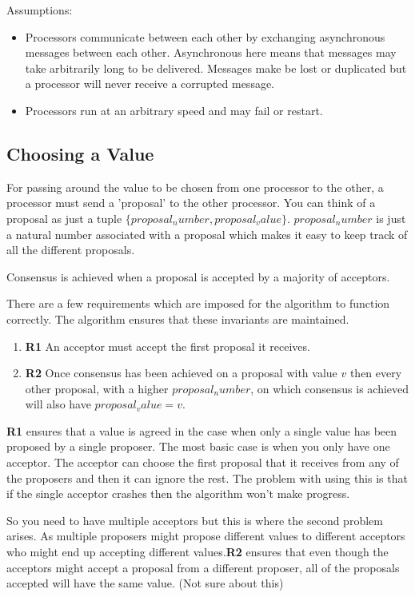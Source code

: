 Assumptions:
\begin{itemize}
  \item Processors communicate between each other by exchanging asynchronous messages between each other.
    Asynchronous here means that messages may take arbitrarily long to be delivered.
    Messages make be lost or duplicated but a processor will never receive a corrupted message.
  \item Processors run at an arbitrary speed and may fail or restart.
\end{itemize}

\subsection{Choosing a Value}
For passing around the value to be chosen from one processor to the other,
a processor must send a 'proposal' to the other processor.
You can think of a proposal as just a tuple $\lbrace proposal_number, proposal_value \rbrace$.
$proposal_number$ is just a natural number associated with a proposal which makes
it easy to keep track of all the different proposals.

Consensus is achieved when a proposal is accepted by a majority of acceptors.

There are a few requirements which are imposed for the algorithm to function correctly.
The algorithm ensures that these invariants are maintained.
\begin{enumerate}
  \item \textbf{R1} An acceptor must accept the first proposal it receives.
  \item \textbf{R2} Once consensus has been achieved on a proposal with value $v$
    then every other proposal, with a higher $proposal_number$, on which consensus
    is achieved will also have $proposal_value = v$.
\end{enumerate}

\textbf{R1} ensures that a value is agreed in the case when only a single value
has been proposed by a single proposer. The most basic case is when you only have
one acceptor. The acceptor can choose the first proposal that it receives from
any of the proposers and then it can ignore the rest. The problem with using
this is that if the single acceptor crashes then the algorithm won't make progress.

So you need to have multiple acceptors but this is where the second problem arises.
As multiple proposers might propose different values to different acceptors who
might end up accepting different values.\textbf{R2} ensures that even though the
acceptors might accept a proposal from a different proposer, all of the
proposals accepted will have the same value. (Not sure about this)

